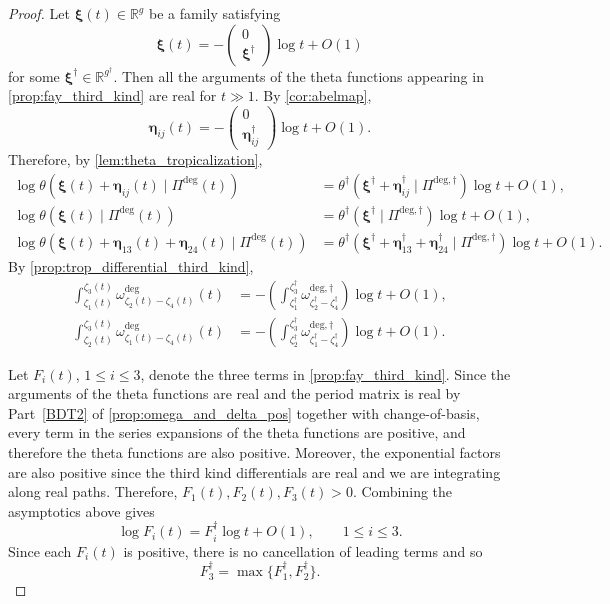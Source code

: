 \documentclass[12pt]{amsart}
\makeatletter
\numberwithin{equation}{section}
\newcommand{\itemrefperh@ps}[2]{\textup{#2}}
\newcommand{\itemref}[1]{\begingroup\let\perh@ps\itemrefperh@ps\ref{#1}\endgroup}
\theoremstyle{definition}
\newcommand{\R}{\mathbb{R}}
\def\trop{\dagger}
\def\vecptjac{\bm{\xi}}
\def\ptSig{\zeta}
\makeatother
\begin{document}
\begin{proof}
Let
$
\vecptjac(t)\in\R^g
$
be a family satisfying
\[
\vecptjac(t)
=
-
\begin{pmatrix}
0\\
\vecptjac^\trop
\end{pmatrix}
\log t
+
O(1)
\]
for some
$
\vecptjac^\trop\in\R^{g^\trop}.
$
Then all the arguments of the theta functions appearing in
\cref{prop:fay_third_kind} are real for $t\gg1$. By \cref{cor:abelmap},
\[
\bm \eta_{ij}(t)
=
-
\begin{pmatrix}
0\\
\bm \eta_{ij}^\trop
\end{pmatrix}
\log t
+
O(1).
\]
Therefore, by \cref{lem:theta_tropicalization},
\[
\begin{aligned}
\log
\theta(
\vecptjac(t)+\bm \eta_{ij}(t)
\mid
\Pi^{\mathrm{deg}}(t)
)
&=
\theta^\trop(
\vecptjac^\trop+\bm \eta_{ij}^\trop
\mid
\Pi^{\mathrm{deg},\trop}
)
\log t
+
O(1),\\
\log
\theta(
\vecptjac(t)
\mid
\Pi^{\mathrm{deg}}(t)
)
&=
\theta^\trop(
\vecptjac^\trop
\mid
\Pi^{\mathrm{deg},\trop}
)
\log t
+
O(1),\\
\log
\theta(
\vecptjac(t)+\bm \eta_{13}(t)+\bm \eta_{24}(t)
\mid
\Pi^{\mathrm{deg}}(t)
)
&=
\theta^\trop(
\vecptjac^\trop
+
\bm \eta_{13}^\trop
+
\bm \eta_{24}^\trop
\mid
\Pi^{\mathrm{deg},\trop}
)
\log t
+
O(1).
\end{aligned}
\]
By \cref{prop:trop_differential_third_kind},
\begin{align*}
\int_{\ptSig_1(t)}^{\ptSig_3(t)}
\omega_{\ptSig_2(t)-\ptSig_4(t)}^{\mathrm{deg}}(t)
&=
-
\left(
\int_{\ptSig_1^\trop}^{\ptSig_3^\trop}
\omega_{\ptSig_2^\trop-\ptSig_4^\trop}^{\mathrm{deg},\trop}
\right)
\log t
+
O(1),\\
\int_{\ptSig_2(t)}^{\ptSig_3(t)}
\omega_{\ptSig_1(t)-\ptSig_4(t)}^{\mathrm{deg}}(t)
&=
-
\left(
\int_{\ptSig_2^\trop}^{\ptSig_3^\trop}
\omega_{\ptSig_1^\trop-\ptSig_4^\trop}^{\mathrm{deg},\trop}
\right)
\log t
+
O(1).
\end{align*}

Let $F_i(t)$, $1\leq i\leq3$, denote the three terms in
\cref{prop:fay_third_kind}. Since the arguments of the theta functions are real and the period matrix is real by Part~\itemref{BDT2} of \cref{prop:omega_and_delta_pos} together with change-of-basis, every term in the series expansions of the theta functions are positive, and therefore the theta functions are also positive. Moreover, the exponential factors are also positive since the third kind differentials are real and we are integrating along real paths. Therefore, $F_1(t),F_2(t),F_3(t)>0$. Combining the asymptotics above gives
\[
\log F_i(t)
=
F_i^\trop\log t
+
O(1),
\qquad
1\leq i\leq3.
\]
Since each $F_i(t)$ is positive, there is no cancellation of leading terms and so
\[
F_3^\trop
=
\max
\{
F_1^\trop,
F_2^\trop
\}.
\]
\end{proof}



	
	
\end{document}
